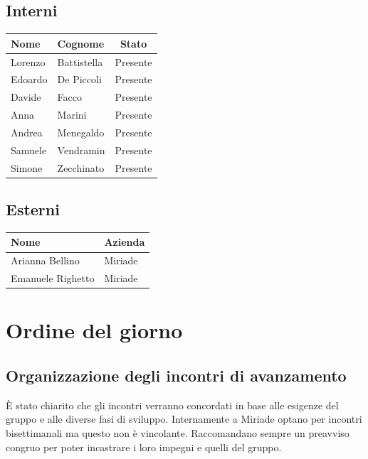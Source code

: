 \documentclass[a4paper, 10pt, colorlinks=true, linkcolor=black, urlcolor=blue, citecolor=blue, hidelinks]{article}
\begin{document}
\subsection{Interni}

\begin{center}
\begin{tabular}{|l|l|c|}
\hline
\textbf{Nome} & \textbf{Cognome} & \textbf{Stato} \\
\hline
Lorenzo & Battistella & Presente \\
Edoardo & De Piccoli & Presente \\
Davide & Facco & Presente \\
Anna & Marini & Presente \\
Andrea & Menegaldo & Presente \\
Samuele & Vendramin & Presente \\
Simone & Zecchinato & Presente \\
\hline
\end{tabular}
\end{center}

\subsection{Esterni}

\begin{center}
\begin{tabular}{|l|l|}
\hline
\textbf{Nome} & \textbf{Azienda} \\
\hline
Arianna Bellino & Miriade \\
\hline
Emanuele Righetto & Miriade \\
\hline
\end{tabular}
\end{center}

\section{Ordine del giorno}

\subsection{Organizzazione degli incontri di avanzamento}
È stato chiarito che gli incontri verranno concordati in base alle esigenze del gruppo e alle diverse fasi di sviluppo. Internamente a Miriade optano per incontri bisettimanali ma questo non è vincolante. Raccomandano sempre un preavviso congruo per poter incastrare i loro impegni e quelli del gruppo.
\end{document}
